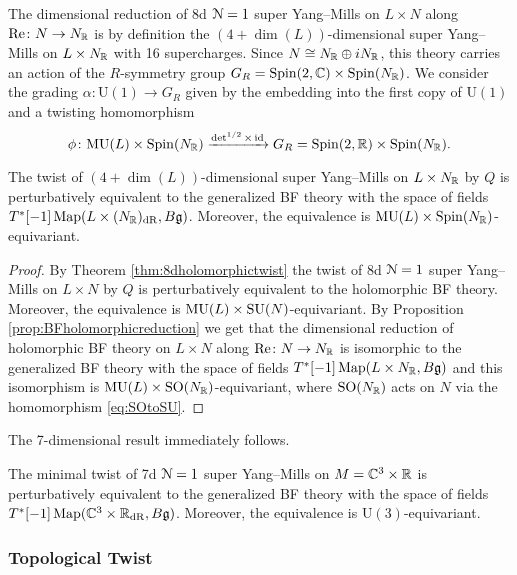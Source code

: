 \documentclass[10pt, oneside]{article}
\newcommand{\MU}{\mathrm{MU}}
\renewcommand{\Re}{\mathrm{Re}}
\renewcommand{\U}{\mathrm{U}}
\begin{document}
The dimensional reduction of 8d $\mathcal N=1$ super Yang--Mills on $L\times N$ along $\Re\colon N\rightarrow N_\RR$ is by definition the $(4+\dim(L))$-dimensional super Yang--Mills on $L\times N_\mathbb R$ with 16 supercharges. Since $N\cong N_\mathbb R\oplus iN_\mathbb R$, this theory carries an action of the $R$-symmetry group $G_R=\mathrm{Spin}(2, \mathbb C)\times \mathrm{Spin}(N_\mathbb R)$. We consider the grading $\alpha\colon \U(1)\rightarrow G_R$ given by the embedding into the first copy of $\U(1)$ and a twisting homomorphism
\[\phi\colon \MU(L)\times \Spin(N_\RR)\xrightarrow{\det^{1/2}\times \id} G_R=\Spin(2, \RR)\times \Spin(N_\RR).\]

\begin{theorem}
The twist of $(4+\dim(L))$-dimensional super Yang--Mills on $L\times N_\mathbb R$ by $Q$ is perturbatively equivalent to the generalized BF theory with the space of fields $T^*[-1] \operatorname{Map}(L\times (N_\mathbb R)_{\mathrm{dR}}, B\mathfrak g)$. Moreover, the equivalence is $\MU(L)\times \Spin(N_\RR)$-equivariant.
\label{thm:8dBFreduction}
\end{theorem}
\begin{proof}
By Theorem \ref{thm:8dholomorphictwist} the twist of 8d $\mathcal N=1$ super Yang--Mills on $L\times N$ by $Q$ is perturbatively equivalent to the holomorphic BF theory. Moreover, the equivalence is $\MU(L)\times \SU(N)$-equivariant. By Proposition \ref{prop:BFholomorphicreduction} we get that the dimensional reduction of holomorphic BF theory on $L\times N$ along $\Re\colon N\rightarrow N_\RR$ is isomorphic to the generalized BF theory with the space of fields $T^*[-1]\operatorname{Map}(L\times N_\mathbb R, B\mathfrak g)$ and this isomorphism is $\MU(L)\times \SO(N_\RR)$-equivariant, where $\mathrm{SO}(N_\mathbb R)$ acts on $N$ via the homomorphism \eqref{eq:SOtoSU}.
\end{proof}

The 7-dimensional result immediately follows.

\begin{theorem}
The minimal twist of 7d $\mathcal N=1$ super Yang--Mills on $M=\mathbb C^3\times \mathbb R$ is perturbatively equivalent to the generalized BF theory with the space of fields $T^*[-1]\operatorname{Map}(\mathbb C^3\times \mathbb R_{\mathrm{dR}}, B\mathfrak g)$. Moreover, the equivalence is $\U(3)$-equivariant.
\label{thm:7dminimaltwist}
\end{theorem}

\subsubsection{Topological Twist}
\label{sect:7dtopologicaltwist}
\end{document}
